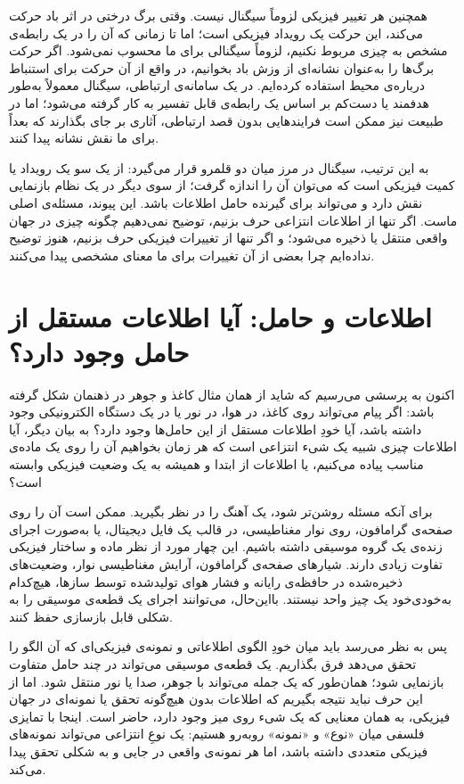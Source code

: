 همچنین هر تغییر فیزیکی لزوماً سیگنال نیست. وقتی برگ درختی در اثر باد حرکت می‌کند، این حرکت یک رویداد فیزیکی است؛ اما تا زمانی که آن را در یک رابطه‌ی مشخص به چیزی مربوط نکنیم، لزوماً سیگنالی برای ما محسوب نمی‌شود. اگر حرکت برگ‌ها را به‌عنوان نشانه‌ای از وزش باد بخوانیم، در واقع از آن حرکت برای استنباط درباره‌ی محیط استفاده کرده‌ایم. در یک سامانه‌ی ارتباطی، سیگنال معمولاً به‌طور هدفمند یا دست‌کم بر اساس یک رابطه‌ی قابل تفسیر به کار گرفته می‌شود؛ اما در طبیعت نیز ممکن است فرایندهایی بدون قصد ارتباطی، آثاری بر جای بگذارند که بعداً برای ما نقش نشانه پیدا کنند.

به این ترتیب، سیگنال در مرز میان دو قلمرو قرار می‌گیرد: از یک سو یک رویداد یا کمیت فیزیکی است که می‌توان آن را اندازه گرفت؛ از سوی دیگر در یک نظام بازنمایی نقش دارد و می‌تواند برای گیرنده حامل اطلاعات باشد. این پیوند، مسئله‌ی اصلی ماست. اگر تنها از اطلاعات انتزاعی حرف بزنیم، توضیح نمی‌دهیم چگونه چیزی در جهان واقعی منتقل یا ذخیره می‌شود؛ و اگر تنها از تغییرات فیزیکی حرف بزنیم، هنوز توضیح نداده‌ایم چرا بعضی از آن تغییرات برای ما معنای مشخصی پیدا می‌کنند.

\section{اطلاعات و حامل: آیا اطلاعات مستقل از حامل وجود دارد؟}
\label{sec:information-and-carrier}

اکنون به پرسشی می‌رسیم که شاید از همان مثال کاغذ و جوهر در ذهنمان شکل گرفته باشد: اگر پیام می‌تواند روی کاغذ، در هوا، در نور یا در یک دستگاه الکترونیکی وجود داشته باشد، آیا خودِ اطلاعات مستقل از این حامل‌ها وجود دارد؟ به بیان دیگر، آیا اطلاعات چیزی شبیه یک شیء انتزاعی است که هر زمان بخواهیم آن را روی یک ماده‌ی مناسب پیاده می‌کنیم، یا اطلاعات از ابتدا و همیشه به یک وضعیت فیزیکی وابسته است؟

برای آنکه مسئله روشن‌تر شود، یک آهنگ را در نظر بگیرید. ممکن است آن را روی صفحه‌ی گرامافون، روی نوار مغناطیسی، در قالب یک فایل دیجیتال، یا به‌صورت اجرای زنده‌ی یک گروه موسیقی داشته باشیم. این چهار مورد از نظر ماده و ساختار فیزیکی تفاوت زیادی دارند. شیارهای صفحه‌ی گرامافون، آرایش مغناطیسی نوار، وضعیت‌های ذخیره‌شده در حافظه‌ی رایانه و فشار هوای تولیدشده توسط سازها، هیچ‌کدام به‌خودی‌خود یک چیز واحد نیستند. بااین‌حال، می‌توانند اجرای یک قطعه‌ی موسیقی را به شکلی قابل بازسازی حفظ کنند.

پس به نظر می‌رسد باید میان خودِ الگوی اطلاعاتی و نمونه‌ی فیزیکی‌ای که آن الگو را تحقق می‌دهد فرق بگذاریم. یک قطعه‌ی موسیقی می‌تواند در چند حامل متفاوت بازنمایی شود؛ همان‌طور که یک جمله می‌تواند با جوهر، صدا یا نور منتقل شود. اما از این حرف نباید نتیجه بگیریم که اطلاعات بدون هیچ‌گونه تحقق یا نمونه‌ای در جهان فیزیکی، به همان معنایی که یک شیء روی میز وجود دارد، حاضر است. اینجا با تمایزی فلسفی میان «نوع» و «نمونه» روبه‌رو هستیم: یک نوعِ انتزاعی می‌تواند نمونه‌های فیزیکی متعددی داشته باشد، اما هر نمونه‌ی واقعی در جایی و به شکلی تحقق پیدا می‌کند.

